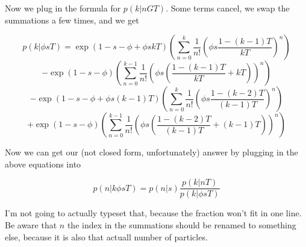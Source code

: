 \documentclass{note}
\begin{document}
\begin{solution}
Now we plug in the formula for $p(k|nGT)$. Some terms cancel, we swap the summations a few times, and we get

\begin{equation*}
p(k | \phi s T) 
= \exp(1 - s - \phi + \phi s kT) 
\left( \sum_{n=0}^{k} \frac{1}{n!} 
\left( \phi s \frac{1 - (k-1)T}{kT} \right)^n \right)
\end{equation*}
\begin{equation*}
- \exp(1 - s - \phi) 
\left( \sum_{n=0}^{k-1} \frac{1}{n!} 
\left( \phi s \left( \frac{1-(k-1)T}{kT} + kT \right) \right)^n \right)
\end{equation*}
\begin{equation*}
- \exp(1 - s - \phi + \phi s (k-1)T) 
\left( \sum_{n=0}^{k} \frac{1}{n!} 
\left( \phi s \frac{1 - (k-2)T}{(k-1)T} \right)^n \right)
\end{equation*}
\begin{equation*}
+ \exp(1 - s - \phi) 
\left( \sum_{n=0}^{k-1} \frac{1}{n!} 
\left( \phi s \left( \frac{1-(k-2)T}{(k-1)T} + (k-1)T \right) \right)^n \right)
\end{equation*}

Now we can get our (not closed form, unfortunately) answer by plugging in the above equations into

\begin{equation*}
p(n | k \phi s T) 
= p(n | s) \frac{p(k | n T)}{p(k | \phi s T)}
\end{equation*}

I'm not going to actually typeset that, because the fraction won't fit in one line. Be aware that $n$ the index in the summations should be renamed to something else, because it is also that actuall number of particles.

\end{solution}
\end{document}
